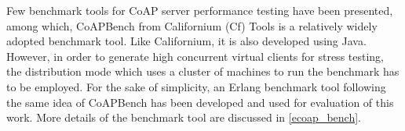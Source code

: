 Few benchmark tools for CoAP server performance testing have been presented, among which, CoAPBench from Californium (Cf) Tools \autocite{coapbench} is a relatively widely adopted benchmark tool. Like Californium, it is also developed using Java. However, in order to generate high concurrent virtual clients for stress testing, the distribution mode which uses a cluster of machines to run the benchmark has to be employed. For the sake of simplicity, an Erlang benchmark tool following the same idea of CoAPBench has been developed and used for evaluation of this work. More details of the benchmark tool are discussed in \autoref{ecoap_bench}.
